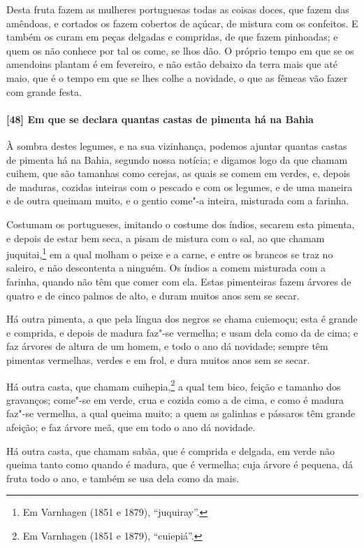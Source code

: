Desta fruta fazem as mulheres portuguesas todas as coisas doces, que fazem das amêndoas, e
cortados os fazem cobertos de açúcar, de mistura com os confeitos. E também os curam em
peças delgadas e compridas, de que fazem pinhoadas; e quem os não conhece por tal os come,
se lhos dão. O próprio tempo em que se os amendoins plantam é em fevereiro, e não estão
debaixo da terra mais que até maio, que é o tempo em que se lhes colhe a novidade, o que
as fêmeas vão fazer com grande festa.

\paragraph{[48] Em que se declara quantas castas de pimenta há na Bahia}\quad
À sombra destes legumes, e na sua vizinhança, podemos ajuntar quantas castas de pimenta há
na Bahia, segundo nossa notícia; e digamos logo da que chamam cuihem, que são tamanhas
como cerejas, as quais se comem em verdes, e, depois de maduras, cozidas inteiras com o
pescado e com os legumes, e de uma maneira e de outra queimam muito, e o gentio come"-a
inteira, misturada com a farinha.

Costumam os portugueses, imitando o costume dos índios, secarem esta pimenta, e depois de
estar bem seca, a pisam de mistura com o sal, ao que chamam juquitai,\footnote{ Em
Varnhagen (1851 e 1879), ``juquiray''.} em a qual molham o peixe e a carne, e entre os
brancos se traz no saleiro, e não descontenta a ninguém. Os índios a comem misturada com a
farinha, quando não têm que comer com ela. Estas pimenteiras fazem árvores de quatro e de
cinco palmos de alto, e duram muitos anos sem se secar.

Há outra pimenta, a que pela língua dos negros se chama cuiemoçu; esta é grande e
comprida, e depois de madura faz"-se vermelha; e usam dela como da de cima; e faz árvores
de altura de um homem, e todo o ano dá novidade; sempre têm pimentas vermelhas, verdes e
em frol, e dura muitos anos sem se secar.

Há outra casta, que chamam cuihepia,\footnote{ Em Varnhagen (1851 e 1879), ``cuiepiá''.} a
qual tem bico, feição e tamanho dos gravanços; come"-se em verde, crua e cozida como a de
cima, e como é madura faz"-se vermelha, a qual queima muito; a quem as galinhas e pássaros
têm grande afeição; e faz árvore meã, que em todo o ano dá novidade.

Há outra casta, que chamam sabãa, que é comprida e delgada, em verde não queima tanto como
quando é madura, que é vermelha; cuja árvore é pequena, dá fruta todo o ano, e também se
usa dela como da mais.

